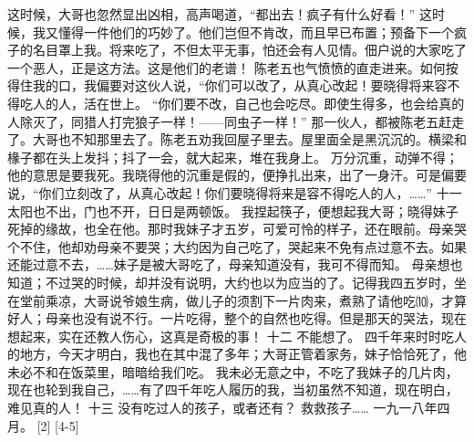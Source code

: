 \documentclass[12pt,UTF8]{ctexbook}
\begin{document}
这时候，大哥也忽然显出凶相，高声喝道，“都出去！疯子有什么好看！”
这时候，我又懂得一件他们的巧妙了。他们岂但不肯改，而且早已布置；预备下一个疯子的名目罩上我。将来吃了，不但太平无事，怕还会有人见情。佃户说的大家吃了一个恶人，正是这方法。这是他们的老谱！
陈老五也气愤愤的直走进来。如何按得住我的口，我偏要对这伙人说，“你们可以改了，从真心改起！要晓得将来容不得吃人的人，活在世上。
“你们要不改，自己也会吃尽。即使生得多，也会给真的人除灭了，同猎人打完狼子一样！——同虫子一样！”
那一伙人，都被陈老五赶走了。大哥也不知那里去了。陈老五劝我回屋子里去。屋里面全是黑沉沉的。横梁和椽子都在头上发抖；抖了一会，就大起来，堆在我身上。
万分沉重，动弹不得；他的意思是要我死。我晓得他的沉重是假的，便挣扎出来，出了一身汗。可是偏要说，“你们立刻改了，从真心改起！你们要晓得将来是容不得吃人的人，……”
十一
太阳也不出，门也不开，日日是两顿饭。
我捏起筷子，便想起我大哥；晓得妹子死掉的缘故，也全在他。那时我妹子才五岁，可爱可怜的样子，还在眼前。母亲哭个不住，他却劝母亲不要哭；大约因为自己吃了，哭起来不免有点过意不去。如果还能过意不去，……妹子是被大哥吃了，母亲知道没有，我可不得而知。
母亲想也知道；不过哭的时候，却并没有说明，大约也以为应当的了。记得我四五岁时，坐在堂前乘凉，大哥说爷娘生病，做儿子的须割下一片肉来，煮熟了请他吃⑽，才算好人；母亲也没有说不行。一片吃得，整个的自然也吃得。但是那天的哭法，现在想起来，实在还教人伤心，这真是奇极的事！
十二
不能想了。
四千年来时时吃人的地方，今天才明白，我也在其中混了多年；大哥正管着家务，妹子恰恰死了，他未必不和在饭菜里，暗暗给我们吃。
我未必无意之中，不吃了我妹子的几片肉，现在也轮到我自己，……有了四千年吃人履历的我，当初虽然不知道，现在明白，难见真的人！
十三
没有吃过人的孩子，或者还有？
救救孩子……
一九一八年四月。 [2] [4-5]
\backmatter
\end{document}
